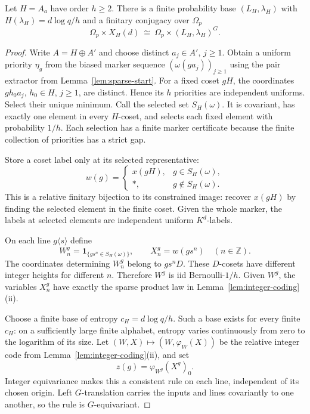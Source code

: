 \documentclass[11pt,a4paper]{article}
\numberwithin{equation}{section}
\begin{document}
\begin{lemma}\label{lem:sparse-code}
Let $H=A_a$ have order $h\geq2$. There is a finite probability base
$(L_H,\lambda_H)$ with $H(\lambda_H)=d\log q/h$ and a finitary
conjugacy over $\Omega_p$
\[
 \Omega_p\times X_H(d)\ \cong\
 \Omega_p\times(L_H,\lambda_H)^G .
\]
\end{lemma}
\begin{proof}
Write $A=H\oplus A'$ and choose distinct $a_j\in A'$, $j\geq1$.
Obtain a uniform priority $\eta_g$ from the biased marker sequence
$(\omega(ga_j))_{j\geq1}$ using the pair extractor from
Lemma~\ref{lem:sparse-start}. For a fixed coset $gH$, the coordinates
$gh_0a_j$, $h_0\in H$, $j\geq1$, are distinct. Hence its $h$
priorities are independent uniforms. Select their unique minimum.
Call the selected set $S_H(\omega)$. It is covariant, has exactly one
element in every $H$-coset, and selects each fixed element with
probability $1/h$. Each selection has a finite marker certificate
because the finite collection of priorities has a strict gap.

Store a coset label only at its selected representative:
\[
 w(g)=
 \begin{cases}
 x(gH),&g\in S_H(\omega),\\
 *,&g\notin S_H(\omega).
 \end{cases}
\]
This is a relative finitary bijection to its constrained image:
recover $x(gH)$ by finding the selected element in the finite coset.
Given the whole marker, the labels at selected elements are
independent uniform $K^d$-labels.

On each line $g\langle s\rangle$ define
\[
 W^g_n=\mathbf1_{\{gs^n\in S_H(\omega)\}},\qquad
 X^g_n=w(gs^n)\quad(n\in\mathbb Z).
\]
The coordinates determining $W^g_n$ belong to $gs^nD$.
These $D$-cosets have different integer heights for different $n$.
Therefore $W^g$ is iid Bernoulli-$1/h$.
Given $W^g$, the variables $X^g_n$ have exactly the sparse product
law in Lemma~\ref{lem:integer-coding}(ii).

Choose a finite base of entropy $c_H=d\log q/h$. Such a base exists
for every finite $c_H$: on a sufficiently large finite alphabet,
entropy varies continuously from zero to the logarithm of its size.
Let $(W,X)\mapsto(W,\varphi_W(X))$ be the relative integer code
from Lemma~\ref{lem:integer-coding}(ii), and set
\[
 z(g)=\varphi_{W^g}(X^g)_0 .
\]
Integer equivariance makes this a consistent rule on each line,
independent of its chosen origin. Left $G$-translation carries
the inputs and lines covariantly to one another, so the rule is
$G$-equivariant.


\end{proof}
\end{document}

